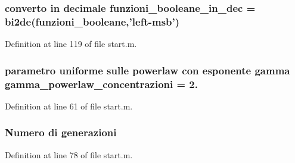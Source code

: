 \hypertarget{a00071_af44cf9f59bd0c10b4d2aa541bd7c156b}{
\subsubsection[{funzioni\-\_\-booleane\-\_\-in\-\_\-dec}]{\setlength{\rightskip}{0pt plus 5cm}converto in decimale funzioni\-\_\-booleane\-\_\-in\-\_\-dec = bi2de(funzioni\-\_\-booleane,'left-\/msb')}}\label{a00071_af44cf9f59bd0c10b4d2aa541bd7c156b}


Definition at line 119 of file start.\-m.

\hypertarget{a00071_a7cd0915d7542523abc226a8eecf67ecf}{
\subsubsection[{gamma\-\_\-powerlaw\-\_\-concentrazioni}]{\setlength{\rightskip}{0pt plus 5cm}parametro uniforme sulle powerlaw con esponente gamma gamma\-\_\-powerlaw\-\_\-concentrazioni = 2.}}\label{a00071_a7cd0915d7542523abc226a8eecf67ecf}


Definition at line 61 of file start.\-m.

\hypertarget{a00071_a5951b3462407a0e7e2e60534f76f5fec}{
\subsubsection[{generazioni}]{\setlength{\rightskip}{0pt plus 5cm}Numero di generazioni}}\label{a00071_a5951b3462407a0e7e2e60534f76f5fec}


Definition at line 78 of file start.\-m.

